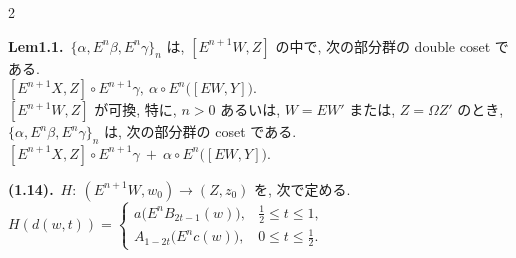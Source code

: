 \documentclass[10pt, leqno]{ltjsarticle}
\newcommand{\Ex}{E}        %
\numberwithin{equation}{section}
\theoremstyle{plain}
\theoremstyle{definition}
\theoremstyle{remark}
\begin{document}
\begin{paracol}{2}
\switchcolumn

\noindent
\textbf{Lem1.1.}\ 
$\{\alpha,\Ex^n\beta,\Ex^n\gamma\}_n$ は,
$[\Ex^{n+1}W, Z]$ の中で,
次の部分群の double coset である.\\
\([\Ex^{n+1}X, Z]\circ \Ex^{n+1}\gamma, \
\alpha\circ \Ex^n\!\bigl([\Ex W, Y]\bigr).\)\\
$[\Ex^{n+1}W, Z]$ が可換,
特に, $n>0$ あるいは, $W=\Ex W'$ または, $Z=\Omega Z'$ のとき, \\
\(\{\alpha,\Ex^n\beta,\Ex^n\gamma\}_n\)
は, 次の部分群の coset である.\\
\([\Ex^{n+1}X, Z]\circ \Ex^{n+1}\gamma \ +\ 
\alpha\circ \Ex^n\!\bigl([\Ex W, Y]\bigr).\)

\noindent
\textbf{(1.14).}\ $H:\ (\Ex^{n+1}W,w_0)\to (Z,z_0)$ を, 次で定める. \\
\(
H(d(w,t))=
\begin{cases}
a\bigl(\Ex^n B_{2t-1}(w)\bigr), & \tfrac12\le t\le 1,\\[2mm]
A_{1-2t}\bigl(\Ex^n c(w)\bigr), & 0\le t\le \tfrac12.
\end{cases}
\)


\end{paracol}
\end{document}
